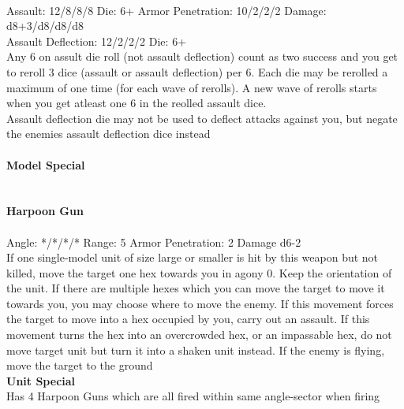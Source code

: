 \ \\
Assault: 12/8/8/8 Die: 6+ Armor Penetration: 10/2/2/2 Damage: d8+3/d8/d8/d8 \\
Assault Deflection: 12/2/2/2 Die: 6+\\
\indent Any 6 on assult die roll (not assault deflection) count as two success and you get to reroll 3 dice (assault or assault deflection) per 6. Each die may be rerolled a maximum of one time (for each wave of rerolls). A new wave of rerolls starts when you get atleast one 6 in the reolled assault dice.\\ Assault deflection die may not be used to deflect attacks against you, but negate the enemies assault deflection dice instead \\
\ \\
{\bf Model Special} \\

\ \\
\ \\
{\bf Harpoon Gun } \\
\ \\
Angle: */*/*/* Range: 5 Armor Penetration: 2 Damage d6-2 \\
\indent If one single-model unit of size large or smaller is hit by this weapon but not killed, move the target one hex towards you in agony 0. Keep the orientation of the unit. If there are multiple hexes which you can move the target to move it towards you, you may choose where to move the enemy. If this movement forces the target to move into a hex occupied by you, carry out an assault. If this movement turns the hex into an overcrowded hex, or an impassable hex, do not move target unit but turn it into a shaken unit instead. If the enemy is flying, move the target to the ground \\






{\bf Unit Special} \\
Has 4 Harpoon Guns which are all fired within same angle-sector when firing


